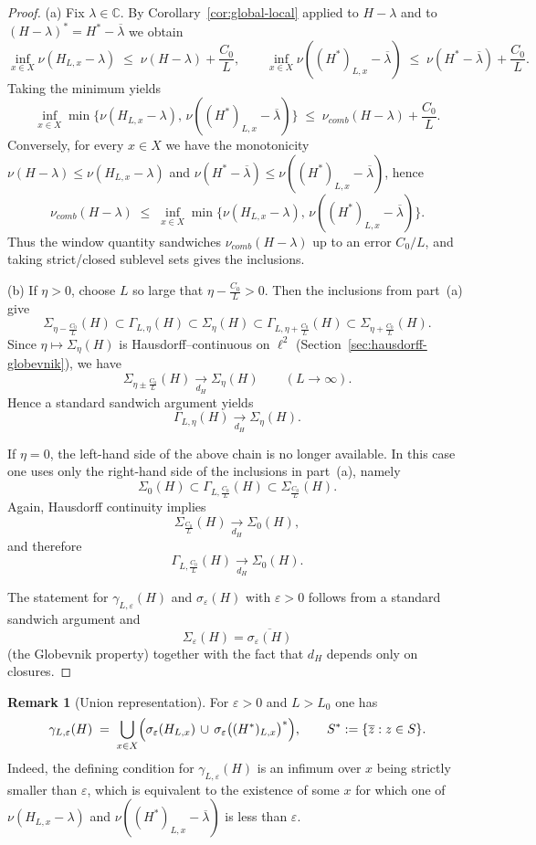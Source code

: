 \documentclass[11pt]{article}
\theoremstyle{definition}
\newtheorem{remark}[theorem]{Remark}
\newcommand{\C}{\mathbb{C}}
\begin{document}
\begin{proof}
(a) Fix $\lambda\in\C$.  By Corollary~\ref{cor:global-local} applied to $H-\lambda$
and to $(H-\lambda)^*=H^*-\overline{\lambda}$ we obtain
\[
  \inf_{x\in X}\nu(H_{L,x}-\lambda)
  \;\le\; \nu(H-\lambda)+\frac{C_0}{L},
  \qquad
  \inf_{x\in X}\nu((H^*)_{L,x}-\overline{\lambda})
  \;\le\; \nu(H^*-\overline{\lambda})+\frac{C_0}{L}.
\]
Taking the minimum yields
\[
  \inf_{x\in X}\min\bigl\{\nu(H_{L,x}-\lambda),\,\nu((H^*)_{L,x}-\overline{\lambda})\bigr\}
  \;\le\; \nu_{comb}(H-\lambda)+\frac{C_0}{L}.
\]
Conversely, for every $x\in X$ we have the monotonicity
$\nu(H-\lambda)\le \nu(H_{L,x}-\lambda)$ and
$\nu(H^*-\overline{\lambda})\le \nu((H^*)_{L,x}-\overline{\lambda})$, hence
\[
  \nu_{comb}(H-\lambda)
  \;\le\;
  \inf_{x\in X}\min\bigl\{\nu(H_{L,x}-\lambda),\,\nu((H^*)_{L,x}-\overline{\lambda})\bigr\}.
\]
Thus the window quantity sandwiches $\nu_{comb}(H-\lambda)$ up to an error
$C_0/L$, and taking strict/closed sublevel sets gives the inclusions.

(b) 
If $\eta>0$, choose $L$ so large that $\eta-\frac{C_0}{L}>0$. Then the inclusions
from part~(a) give
\[
  \Sigma_{\eta-\frac{C_0}{L}}(H)
  \subset
  \Gamma_{L,\eta}(H)
  \subset
  \Sigma_{\eta}(H)
  \subset
  \Gamma_{L,\eta+\frac{C_0}{L}}(H)
  \subset
  \Sigma_{\eta+\frac{C_0}{L}}(H).
\]
Since $\eta\mapsto \Sigma_\eta(H)$ is Hausdorff--continuous on $\ell^2$
(Section~\ref{sec:hausdorff-globevnik}), we have
\[
  \Sigma_{\eta\pm \frac{C_0}{L}}(H)\xrightarrow[d_H]{}\Sigma_\eta(H)
  \qquad (L\to\infty).
\]
Hence a standard sandwich argument yields
\[
  \Gamma_{L,\eta}(H)\xrightarrow[d_H]{}\Sigma_\eta(H).
\]

If $\eta=0$, the left-hand side of the above chain is no longer available. In this case
one uses only the right-hand side of the inclusions in part~(a), namely
\[
  \Sigma_0(H)
  \subset
  \Gamma_{L,\frac{C_0}{L}}(H)
  \subset
  \Sigma_{\frac{C_0}{L}}(H).
\]
Again, Hausdorff continuity implies
\[
  \Sigma_{\frac{C_0}{L}}(H)\xrightarrow[d_H]{}\Sigma_0(H),
\]
and therefore
\[
  \Gamma_{L,\frac{C_0}{L}}(H)\xrightarrow[d_H]{}\Sigma_0(H).
\]

The statement for $\gamma_{L,\varepsilon}(H)$ and $\sigma_\varepsilon(H)$ with
$\varepsilon>0$ follows from a standard sandwich argument and
\[
  \Sigma_\varepsilon(H)=\overline{\sigma_\varepsilon(H)}
\]
(the Globevnik property) together with the fact that $d_H$ depends only on closures.
\end{proof}

\begin{remark}[Union representation]\label{rem:gamma-union}
For $\varepsilon>0$ and $L>L_0$ one has
\[
  \gamma_{L,\varepsilon}(H)
  \;=\;
  \bigcup_{x\in X}
  \Bigl(
    \sigma_\varepsilon(H_{L,x})
    \,\cup\,
    \sigma_\varepsilon\bigl((H^*)_{L,x}\bigr)^{*}
  \Bigr),
  \qquad
  S^*:=\{\overline{z}:z\in S\}.
\]
Indeed, the defining condition for $\gamma_{L,\varepsilon}(H)$ is an infimum
over $x$ being strictly smaller than $\varepsilon$, which is equivalent to the
existence of some $x$ for which one of $
          \nu(H_{L,x}-\lambda)$ and $
          \nu((H^*)_{L,x}-\overline{\lambda})$ is less than $\varepsilon$.
\end{remark}
\end{document}
